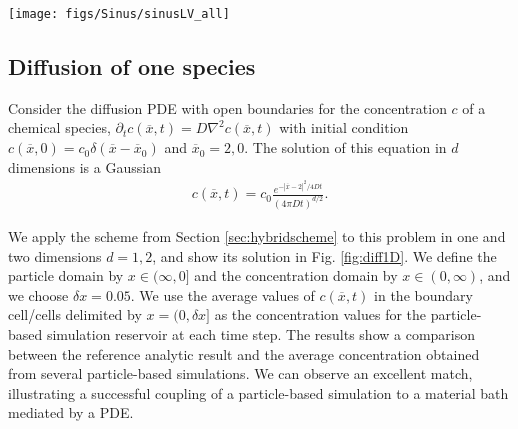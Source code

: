 \documentclass[10pt,twocolumn]{revtex4-1}
\begin{document}
	\begin{figure*}[htb]
	\centering 
	\texttt{[image: figs/Sinus/sinusLV\_all]}
	\caption{Coupling results for a Lotka-Volterra system coupled to a constant in time prey reservoir at three different times $t=4,7,9$. The color bar indicates the value of the concentration. \textbf{a.} Reference solution of preys using a finite difference scheme with $60\times 30$ grid cells and a time step of $0.001$. \textbf{b.} Solution of preys in the hybrid simulation, consisting of the average over $3000$ particle-based simulation. Each particle-based simulations used a time step of $\Delta t = 0.01$ and was coupled to the reservoir following the scheme from Section \ref{sec:hybridscheme}. We use two boundary cell widths, one for the preys ($\delta x_A$) and one for the predators ($\delta x_B$), each satisfies the relation $\Delta t = \delta x_k^2/(2D_k)$ with $k=A$ or $B$. \textbf{c.} Reference solution of the predators corresponding to the same simulation as in Fig. \ref{fig:sinusLV}a. \textbf{d.} Solution of the hybrid simulation for the predators corresponding to the same simulation as in Fig. \ref{fig:sinusLV}b. \textbf{e.} and \textbf{f.} JS divergence, for preys and predators respectively, calculated between the reference concentration and the averaged concentration of the hybrid simulations at the three plotted times. The x-axis is the number of averaged hybrid simulations, and each point is calculated using $500$ bootstrapped samples.}
	\label{fig:sinusLV} 
	\end{figure*}

	
	\subsection{Diffusion of one species}
	
	Consider the diffusion PDE with open boundaries for the concentration $c$ of a chemical species, $\partial_t c(\overline{x},t)=D\nabla^2c(\overline{x},t)$ with initial condition $c(\overline{x},0)=c_0\delta(\overline{x}-\overline{x}_0)$ and $\overline{x}_0=2,0$. The solution of this equation in $d$ dimensions is a Gaussian
	\begin{align}
	c(\overline{x},t)=c_0\frac{e^{-|\overline{x}-2|^2/4Dt} }{(4\pi D t)^{d/2}}.
	\label{eq:solgauss}
	\end{align}
	
	We apply the scheme from Section \ref{sec:hybridscheme} to this problem in one and two dimensions $d=1,2$, and show its solution in Fig. \ref{fig:diff1D}. We define the particle domain by $x\in(\infty,0]$ and the concentration domain by $x\in(0,\infty)$, and we choose $\delta x=0.05$. We use the average values of $c(\overline{x},t)$ in the boundary cell/cells delimited by $x=(0,\delta x]$ as the concentration values for the particle-based simulation reservoir at each time step. The results show a comparison between the reference analytic result and the average concentration obtained from several particle-based simulations. We can observe an excellent match, illustrating a successful coupling of a particle-based simulation to a material bath mediated by a PDE. 
	
\end{document}
